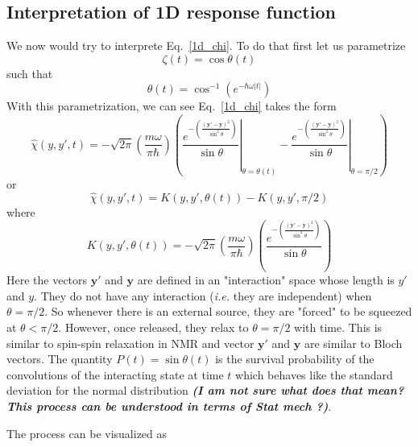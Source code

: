 \documentclass[jcp,groupaddress]{revtex4-1}
\newcommand{\eq}{\begin{equation}}
\newcommand{\qe}{\end{equation}}
\newcommand{\abs}[1]{\vert #1\vert}
\newcommand{\ie}{\emph{i.e. }}
\begin{document}
\subsection{Interpretation of 1D response function}
We now would try to interprete Eq.~\eqref{1d_chi}. To do that first let us parametrize
\eq
 \zeta(t)= \cos \theta(t)
\qe 
such that 
\eq
 \theta(t) = \cos^{-1} (e^{-\hbar \omega \abs{t}})
\qe
 With this parametrization, we can see Eq.~\eqref{1d_chi} takes the form 
\eq\label{1d_chi_theta}
\hat{\chi}(y, y', t)=-\sqrt{2\pi}\left( \frac{m \omega}{\pi \hbar}\right) \left(\left. \frac{e^{-\left(\frac{(\mathbf{y}'-\mathbf{y})^{2}}{\sin^2 \theta}\right)}}{\sin \theta}\right \rvert_{\theta=\theta(t)}- \left. \frac{e^{-\left(\frac{(\mathbf{y}'-\mathbf{y})^{2}}{\sin^2 \theta}\right)}}{\sin \theta} \right \rvert_{\theta=\pi/2}\right)
\qe
or 
\eq
\hat{\chi}(y, y', t)= K(y, y', \theta(t))- K(y, y', \pi/2)
\qe
where 
\eq
K(y, y', \theta(t)) = -\sqrt{2\pi}\left( \frac{m \omega}{\pi \hbar}\right) \left( \frac{e^{-\left(\frac{(\mathbf{y}'-\mathbf{y})^{2}}{\sin^2 \theta}\right)}}{\sin \theta}\right)
\qe
Here the vectors $\mathbf{y}'$ and $\mathbf{y}$ are defined in an "interaction" space whose length is $y'$ and $y$. They do not have any interaction (\ie they are independent) when $\theta = \pi/2$. So whenever there is an external source, they are "forced" to be squeezed at $\theta < \pi/2$. However, once released, they relax to $\theta = \pi/2$ with time. This is similar to spin-spin relaxation in NMR and vector $\mathbf{y}'$ and $\mathbf{y}$ are similar to Bloch vectors. The quantity $P(t) = \sin \theta(t)$ is the survival probability of the convolutions of the interacting state at time $t$ which behaves like the standard deviation for the normal distribution \textbf{\emph{(I am not sure what does that mean? This process can be understood in terms of Stat mech ?)}}. 

The process can be visualized as 
\end{document}
